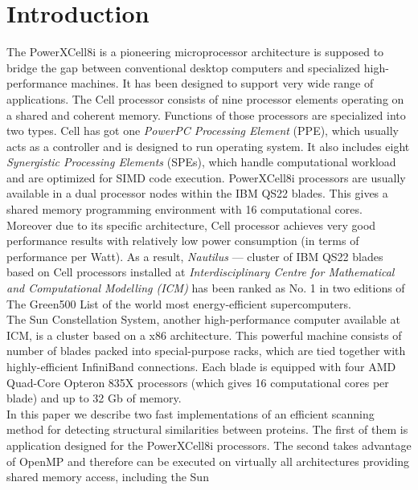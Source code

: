 \documentclass[envcountsame,envcountchap]{svmono}
\begin{document}
\section{Introduction}
The PowerXCell8i is a pioneering microprocessor architecture
is supposed to bridge the gap between conventional desktop computers and
specialized high-performance machines.
It has been designed to support very wide range of applications.
The Cell processor consists of nine processor elements operating on a
shared and coherent memory.
Functions of those processors are specialized into two types.
Cell has got one \emph{PowerPC Processing Element} (PPE), which usually acts
as a controller and is designed to run operating system.
It also includes eight \emph{Synergistic Processing Elements} (SPEs), which
handle computational workload and are optimized for SIMD code execution.
PowerXCell8i processors are usually available in a dual processor nodes within
the IBM QS22 blades.
This gives a shared memory programming environment with 16
computational cores.
Moreover due to its specific architecture, Cell processor achieves very good
performance results with relatively low power consumption (in terms of
performance per Watt).
As a result, \emph{Nautilus} \cite{nau} --- cluster of IBM QS22 blades based on
Cell processors installed at \emph{Interdisciplinary Centre for Mathematical and
Computational Modelling (ICM)} has been ranked as No. 1 in two editions of
The Green500 List \cite{g500} of the world most energy-efficient supercomputers.\\
The Sun Constellation System, another high-performance computer available at ICM,
is a cluster based on a x86 architecture.
This powerful machine consists of number of blades packed into special-purpose
racks, which are tied together with highly-efficient InfiniBand connections.
Each blade is equipped with four AMD Quad-Core Opteron 835X processors (which
gives 16 computational cores per blade) and up to 32 Gb of memory.\\
In this paper we describe two fast implementations of an efficient scanning
method for detecting structural similarities between proteins.
The first of them is application designed for the PowerXCell8i processors.
The second takes advantage of OpenMP and therefore can be executed on
virtually all architectures providing shared memory access, including the Sun
\end{document}
